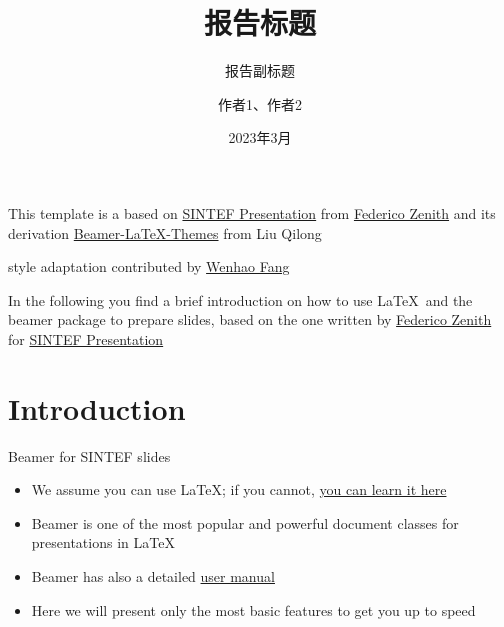 \documentclass{beamer}
\title{报告标题}
\subtitle{报告副标题}
\author{作者1、作者2}
\date{2023年3月}
\newcommand{\hrefcol}[2]{\textcolor{cyan}{\href{#1}{#2}}}
\begin{document}
\maketitle

\begin{frame}

This template is a based on \hrefcol{https://www.overleaf.com/latex/templates/sintef-presentation/jhbhdffczpnx}{SINTEF Presentation} from \hrefcol{mailto:federico.zenith@sintef.no}{Federico Zenith} and its derivation \hrefcol{https://github.com/TOB-KNPOB/Beamer-LaTeX-Themes}{Beamer-LaTeX-Themes} from Liu Qilong

\vspace{\baselineskip}

 style adaptation contributed by \hrefcol{https://github.com/FangWHao}{Wenhao Fang}

\vspace{\baselineskip}

In the following you find a brief introduction on how to use \LaTeX\ and the beamer package to prepare slides, based on the one written by \hrefcol{mailto:federico.zenith@sintef.no}{Federico Zenith} for \hrefcol{https://www.overleaf.com/latex/templates/sintef-presentation/jhbhdffczpnx}{SINTEF Presentation}


\end{frame}

\section{Introduction}

\begin{frame}{Beamer for SINTEF slides}
\begin{itemize}
\item We assume you can use \LaTeX; if you cannot,
\hrefcol{http://en.wikibooks.org/wiki/LaTeX/}{you can learn it here}
\item Beamer is one of the most popular and powerful document
classes for presentations in \LaTeX
\item Beamer has also a detailed
\hrefcol{http://www.ctan.org/tex-archive/macros/latex/contrib/beamer/doc/beameruserguide.pdf}{user
 manual}
\item Here we will present only the most basic features to get you up to speed
\end{itemize}
\end{frame}
\end{document}
